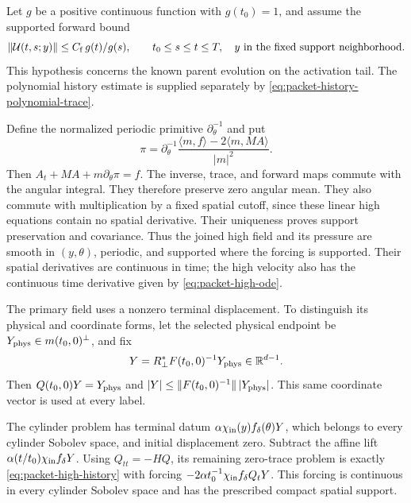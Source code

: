 \documentclass[11pt]{article}
\newcommand{\R}{\mathbb R}
\theoremstyle{definition}
\begin{document}
Let $g$ be a positive continuous function with $g(t_0)=1$, and assume
the supported forward bound
\begin{equation}\label{eq:packet-tail-propagator}
 \|\mathcal U(t,s;y)\|\le C_{\rm f}\,g(t)/g(s),
 \qquad t_0\le s\le t\le T,
 \quad y\text{ in the fixed support neighborhood}.
\end{equation}
This hypothesis concerns the known parent evolution on the activation
tail. The polynomial history estimate is supplied separately by
\eqref{eq:packet-history-polynomial-trace}.

Define the normalized periodic primitive $\partial_\theta^{-1}$ and put
\begin{equation}\label{eq:packet-high-pressure}
 \pi=\partial_\theta^{-1}
       \frac{\langle m,f\rangle-2\langle m,MA\rangle}{|m|^2}.
\end{equation}
Then $A_t+MA+m\partial_\theta\pi=f$. The inverse, trace, and forward
maps commute with the angular integral. They therefore preserve zero
angular mean. They also commute with multiplication by a fixed spatial
cutoff, since these linear high equations contain no spatial derivative.
Their uniqueness proves support preservation and covariance. Thus the
joined high field and its pressure are smooth in $(y,\theta)$, periodic,
and supported where the forcing is supported. Their spatial derivatives
are continuous in time; the high velocity also has the continuous time
derivative given by \eqref{eq:packet-high-ode}.

The primary field uses a nonzero terminal displacement. To distinguish its
physical and coordinate forms, let the selected physical endpoint be
$Y_{\rm phys}\in m(t_0,0)^\perp$, and fix
\[
 Y=R_\perp^*F(t_0,0)^{-1}Y_{\rm phys}\in\R^{d-1}.
\]
Then $Q(t_0,0)Y=Y_{\rm phys}$ and
$|Y|\le\|F(t_0,0)^{-1}\|\,|Y_{\rm phys}|$. This same coordinate
vector is used at every label.

The cylinder problem has terminal datum
$\alpha\chi_{\rm in}(y)f_\delta(\theta)Y$, which belongs to every
cylinder Sobolev space, and initial displacement zero. Subtract the
affine lift $\alpha(t/t_0)\chi_{\rm in}f_\delta Y$. Using
$Q_{tt}=-HQ$, its remaining zero-trace problem is exactly
\eqref{eq:packet-high-history} with forcing
$-2\alpha t_0^{-1}\chi_{\rm in}f_\delta Q_tY$. This forcing is
continuous in every cylinder Sobolev space and has the prescribed
compact spatial support.
\end{document}
